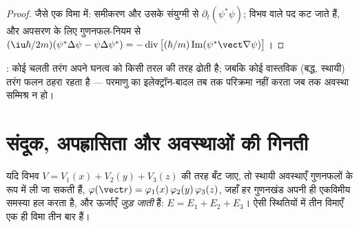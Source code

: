 \begin{proof}
जैसे एक विमा में: समीकरण और उसके संयुग्मी से $\partial_t(\psi^*\psi)$;
विभव वाले पद कट जाते हैं, और अपसरण के लिए गुणनफल-नियम से
$(\iu\hbar/2m)
(\psi^*\Delta\psi - \psi\Delta\psi^*) =
-\operatorname{div}\big[(\hbar/m)\operatorname{Im}(\psi^*\vect\nabla
\psi)\big]$।
\end{proof}

\begin{omfigure}

{\small {}: कोई चलती तरंग अपने घनत्व को किसी तरल की तरह
ढोती है; जबकि कोई वास्तविक (बद्ध, स्थायी) तरंग फलन ठहरा रहता है ---
परमाणु का इलेक्ट्रॉन-बादल तब तक परिक्रमा नहीं करता जब तक अवस्था
सम्मिश्र न हो।}
\end{omfigure}

\section{संदूक, अपह्रासिता और अवस्थाओं की गिनती}

\begin{theorem}[चरों का पृथक्करण]\label{thm:b3:schrodinger-three-dimensions:separation}
यदि विभव $V = V_1(x) + V_2(y) + V_3(z)$ की तरह बँट जाए, तो
स्थायी अवस्थाएँ गुणनफलों के रूप में ली जा सकती हैं,
$\varphi(\vect r) = \varphi_1(x)\,\varphi_2(y)\,\varphi_3(z)$, जहाँ
हर गुणनखंड अपनी ही एकविमीय समस्या हल करता है, और ऊर्जाएँ
\emph{जुड़ जाती} हैं: $E = E_1 + E_2 + E_3$। ऐसी स्थितियों में तीन
विमाएँ एक ही विमा तीन बार हैं।
\end{theorem}

